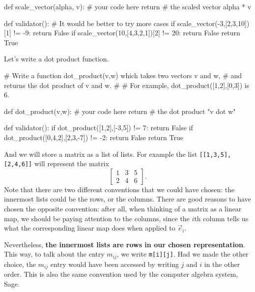 \documentclass{ximera}
\begin{document}
\begin{exercise}
\begin{solution}
\begin{python}
def scale_vector(alpha, v):
  # your code here
  return # the scaled vector alpha * v

def validator():
  # It would be better to try more cases
  if scale_vector(-3,[2,3,10])[1] != -9:
    return False
  if scale_vector(10,[4,3,2,1])[2] != 20:
    return False
  return True

\end{python}
\end{solution}

Let's write a dot product function.

\begin{solution}
\begin{python}
# Write a function dot_product(v,w) which takes two vectors v and w,
# and returns the dot product of v and w.
#
# For example, dot_product([1,2],[0,3]) is 6.
		
def dot_product(v,w):
  # your code here
  return # the dot product "v dot w"

def validator():
  if dot_product([1,2],[-3,5]) != 7:
    return False
  if dot_product([0,4,2],[2,3,-7]) != -2:
    return False
  return True
\end{python}
\end{solution}

\end{exercise}

And we will store a matrix as a list of lists.  For example the list
\verb|[[1,3,5],[2,4,6]]| will represent the matrix
\[
\begin{bmatrix}
 1 & 3 & 5 \\
 2 & 4 & 6  
\end{bmatrix}.
\]
Note that there are two different conventions that we could have
chosen: the innermost lists could be the rows, or the columns.  There
are good reasons to have chosen the opposite convention: after all,
when thinking of a matrix as a linear map, we should be paying
attention to the columns, since the $i$th column tells us what the
corresponding linear map does when applied to $\vec{e}_i$.

Nevertheless, \textbf{the innermost lists are rows in our chosen
  representation}.  This way, to talk about the entry $m_{ij}$, we
write \verb|m[i][j]|.  Had we made the other choice, the $m_{ij}$
entry would have been accessed by writing $j$ and $i$ in the other
order.  This is also the same convention used by the computer algebra
system, Sage.
\end{document}
